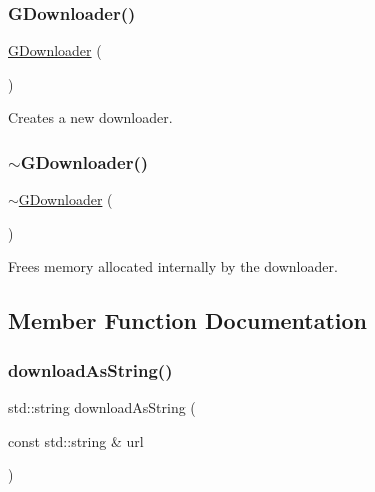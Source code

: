 \subsubsection{\texorpdfstring{G\+Downloader()}{GDownloader()}}
{\footnotesize\ttfamily \mbox{\hyperlink{classGDownloader}{G\+Downloader}} (\begin{DoxyParamCaption}{ }\end{DoxyParamCaption})}



Creates a new downloader. 

\mbox{\label{classGDownloader_a6a9f476cb937e98d417d8ab43b8cd8d5}} 
\subsubsection{\texorpdfstring{$\sim$\+G\+Downloader()}{~GDownloader()}}
{\footnotesize\ttfamily $\sim$\mbox{\hyperlink{classGDownloader}{G\+Downloader}} (\begin{DoxyParamCaption}{ }\end{DoxyParamCaption})\hspace{0.3cm}{\ttfamily [virtual]}}



Frees memory allocated internally by the downloader. 



\subsection{Member Function Documentation}
\mbox{\label{classGDownloader_a27b002ce17000e199302c608363c97a2}} 
\subsubsection{\texorpdfstring{download\+As\+String()}{downloadAsString()}}
{\footnotesize\ttfamily std\+::string download\+As\+String (\begin{DoxyParamCaption}\item[{const std\+::string \&}]{url }\end{DoxyParamCaption})}



